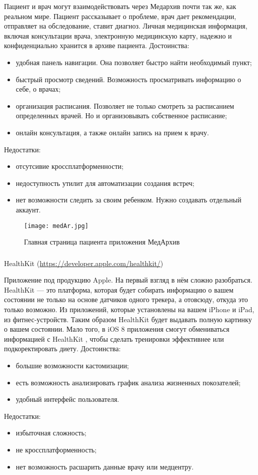 Пациент и врач могут взаимодействовать через Медархив почти так же, как реальном мире. Пациент рассказывает о проблеме, врач дает рекомендации, отправляет на обследование, ставит диагноз. Личная медицинская информация, включая консультации врача, электронную медицинскую карту, надежно и конфиденциально хранится в архиве пациента.
Достоинства:
\begin{itemize}
  \item удобная панель навигации. Она позволяет быстро найти необходимый пункт;
  \item быстрый просмотр сведений. Возможность просматривать информацию о себе, о врачах;
  \item организация расписания. Позволяет не только смотреть за расписанием определенных врачей. Но и организовывать собственное расписание;
  \item онлайн консультация, а также онлайн запись на прием к врачу.
\end{itemize}
Недостатки:
\begin{itemize}
  \item отсутсивие кроссплатформенности;
  \item недоступность утилит для автоматизации создания встреч;
  \item нет возможности следить за своим ребенком. Нужно создавать отдельный аккаунт.
\end{itemize}
\begin{figure}[ht]
\centering
  \texttt{[image: medAr.jpg]}  
  \caption{ Главная страница пациента приложения МедАрхив }
  \label{fig:domain:manual_structure:credit_med}
\end{figure}

\subsubsection{}HealthKit (\url{https://developer.apple.com/healthkit/}) 

Приложение под продукцию Apple. На первый взгляд в нём сложно разобраться. HealthKit — это платформа, которая будет собирать информацию о вашем состоянии не только на основе датчиков одного трекера, а отовсюду, откуда это только возможно. Из приложений, которые установлены на вашем iPhone и iPad, из фитнес-устройств. Таким образом HealthKit будет выдавать полную картинку о вашем состоянии. Мало того, в iOS 8 приложения смогут обмениваться информацией с HealthKit , чтобы сделать тренировки эффективнее или подкоректировать диету.
Достоинства:
\begin{itemize}
  \item большие возможности кастомизации;
  \item есть возможность анализировать график анализа жизненных покозателей;
  \item удобный интерфейс пользователя.
\end{itemize}
Недостатки:
\begin{itemize}
  \item избыточная сложность;
  \item не кроссплатформенность;
  \item нет возможность расшарить данные врачу или медцентру.
\end{itemize}


